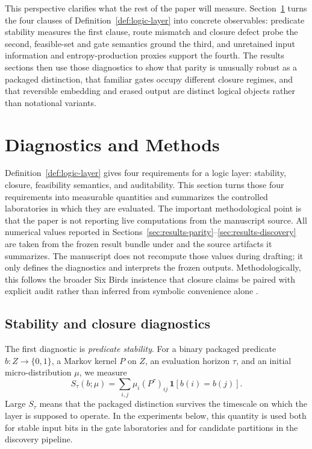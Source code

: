 \documentclass[11pt]{article}
\theoremstyle{definition}
\begin{document}
This perspective clarifies what the rest of the paper will measure. Section~\ref{sec:diagnostics-methods} turns the four clauses of Definition~\ref{def:logic-layer} into concrete observables: predicate stability measures the first clause, route mismatch and closure defect probe the second, feasible-set and gate semantics ground the third, and unretained input information and entropy-production proxies support the fourth. The results sections then use those diagnostics to show that parity is unusually robust as a packaged distinction, that familiar gates occupy different closure regimes, and that reversible embedding and erased output are distinct logical objects rather than notational variants.
 \section{Diagnostics and Methods}
\label{sec:diagnostics-methods}

Definition~\ref{def:logic-layer} gives four requirements for a logic layer: stability, closure, feasibility semantics, and auditability. This section turns those four requirements into measurable quantities and summarizes the controlled laboratories in which they are evaluated. The important methodological point is that the paper is not reporting live computations from the manuscript source. All numerical values reported in Sections~\ref{sec:results-parity}--\ref{sec:results-discovery} are taken from the frozen result bundle under  and the source artifacts it summarizes. The manuscript does not recompute those values during drafting; it only defines the diagnostics and interprets the frozen outputs.
Methodologically, this follows the broader Six Birds insistence that closure claims be paired with explicit audit rather than inferred from symbolic convenience alone \cite{tsiokos2026countstone,tsiokos2026minsubstrate}.

\subsection{Stability and closure diagnostics}

The first diagnostic is \emph{predicate stability}. For a binary packaged predicate \(b : Z \to \{0,1\}\), a Markov kernel \(P\) on \(Z\), an evaluation horizon \(\tau\), and an initial micro-distribution \(\mu\), we measure
\[
S_\tau(b;\mu)
=
\sum_{i,j} \mu_i (P^\tau)_{ij}\,\mathbf{1}[b(i)=b(j)].
\]
Large \(S_\tau\) means that the packaged distinction survives the timescale on which the layer is supposed to operate. In the experiments below, this quantity is used both for stable input bits in the gate laboratories and for candidate partitions in the discovery pipeline.
\end{document}
